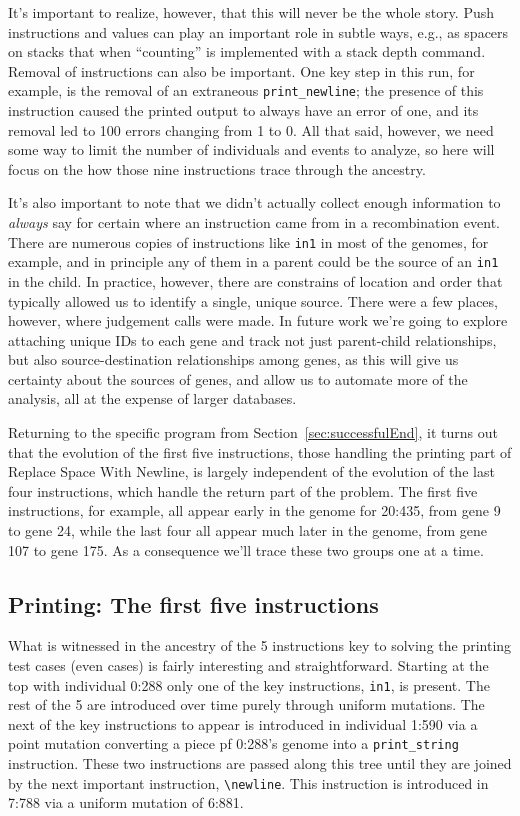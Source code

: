 It's important to realize, however, that this will
never be the whole story. Push instructions and values can play an 
important role in subtle ways, e.g., as spacers on stacks that when
``counting'' is implemented with a stack depth command. Removal of
instructions can also be important. One key step in this run, for example, 
is the removal of an extraneous \texttt{print\_newline}; the presence of this
instruction caused the printed output to always have an error of one,
and its removal led to 100 errors changing
from 1 to 0. All that said, however, we need some way to limit the number
of individuals and events to analyze, so here will focus on the how those
nine instructions trace through the ancestry.

It's also important to note that we didn't actually collect enough information
to \emph{always} say for certain where an instruction came from in a 
recombination event. There are numerous copies of instructions like
\texttt{in1} in most of the genomes, for example, and in principle any of them
in a parent could be the source of an \texttt{in1} in the child. In practice,
however, there are constrains of location and order that typically allowed
us to identify a single, unique source. There were a few places, however, where
judgement calls were made. In future work we're going to explore attaching
unique IDs to each gene and track not just parent-child relationships, but
also source-destination relationships among genes, as this will give us
certainty about the sources of genes, and allow us to automate more of the
analysis, all at the expense of larger databases.

Returning to the specific program from Section~\ref{sec:successfulEnd},
it turns
out that the evolution of the first five instructions, those handling the
printing part of Replace Space With Newline, is largely independent of
the evolution of the last four instructions, which handle the return part
of the problem. The first five instructions, for example, all appear early 
in the genome for 20:435, from gene 9 to gene 24, while the last four 
all appear much later in the genome, from gene 107 to gene 175. As a consequence
we'll trace these two groups one at a time.

\subsection{Printing: The first five instructions}
\label{sec:Printing}

What is witnessed in the ancestry of the 5 instructions key to solving the printing test
cases (even cases) is fairly interesting and straightforward. Starting at the top with individual 0:288 only
one of the key instructions, \texttt{in1}, is present. The rest of the 5 are introduced over time purely
through uniform mutations. The next of the key instructions to appear is introduced in individual 1:590 via a point
mutation converting a piece pf 0:288's genome into a \texttt{print\_string} instruction. These two
instructions are passed along this tree until they are joined by the next important instruction,
\texttt{\textbackslash newline}. This instruction is introduced in 7:788 via a uniform mutation
of 6:881.

